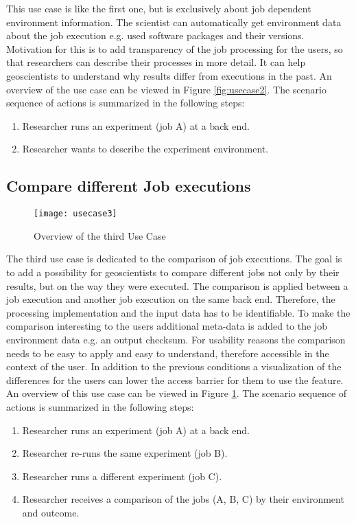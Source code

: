 \documentclass[draft,final]{vutinfth} %
\begin{document}
This use case is like the first one, but is exclusively about job dependent environment information. The scientist can automatically get environment data about the job execution e.g. used software packages and their versions. Motivation for this is to add transparency of the job processing for the users, so that researchers can describe their processes in more detail. It can help geoscientists to understand why results differ from executions in the past. An overview of the use case can be viewed in Figure \ref{fig:usecase2}. 
The scenario sequence of actions is summarized in the following steps: \\
\begin{enumerate}
	\item Researcher runs an experiment (job A) at a back end.
	\item Researcher wants to describe the experiment environment.
\end{enumerate}

\subsection{Compare different Job executions}\label{UseCase3}
\begin{figure}[h]
	\centering
	\texttt{[image: usecase3]}
	\caption{Overview of the third Use Case}
	\label{fig:usecase3} %
\end{figure}
The third use case is dedicated to the comparison of job executions. The goal is to add a possibility for geoscientists to compare different jobs not only by their results, but on the way they were executed. The comparison is applied between a job execution and another job execution on the same back end. Therefore, the processing implementation and the input data has to be identifiable. To make the comparison interesting to the users additional meta-data is added to the job environment data e.g. an output checksum. For usability reasons the comparison needs to be easy to apply and easy to understand, therefore accessible in the context of the user. In addition to the previous conditions a visualization of the differences for the users can lower the access barrier for them to use the feature. An overview of this use case can be viewed in Figure \ref{fig:usecase3}.
The scenario sequence of actions is summarized in the following steps: \\
\begin{enumerate}
	\item Researcher runs an experiment (job A) at a back end.
	\item Researcher re-runs the same experiment (job B).
	\item Researcher runs a different experiment (job C).   
	\item Researcher receives a comparison of the jobs (A, B, C) by their environment and outcome.
\end{enumerate}
\end{document}
